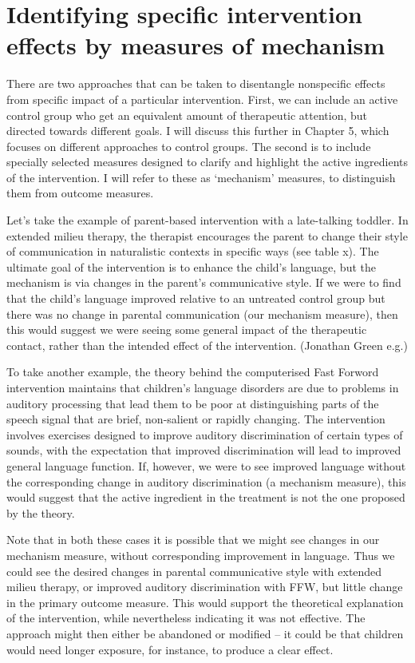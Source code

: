 \documentclass[]{book}
\begin{document}
\hypertarget{identifying-specific-intervention-effects-by-measures-of-mechanism}{%
\section{Identifying specific intervention effects by measures of mechanism}\label{identifying-specific-intervention-effects-by-measures-of-mechanism}}

There are two approaches that can be taken to disentangle nonspecific effects from specific impact of a particular intervention. First, we can include an active control group who get an equivalent amount of therapeutic attention, but directed towards different goals. I will discuss this further in Chapter 5, which focuses on different approaches to control groups. The second is to include specially selected measures designed to clarify and highlight the active ingredients of the intervention. I will refer to these as `mechanism' measures, to distinguish them from outcome measures.

Let's take the example of parent-based intervention with a late-talking toddler. In extended milieu therapy, the therapist encourages the parent to change their style of communication in naturalistic contexts in specific ways (see table x). The ultimate goal of the intervention is to enhance the child's language, but the mechanism is via changes in the parent's communicative style. If we were to find that the child's language improved relative to an untreated control group but there was no change in parental communication (our mechanism measure), then this would suggest we were seeing some general impact of the therapeutic contact, rather than the intended effect of the intervention.
(Jonathan Green e.g.)

To take another example, the theory behind the computerised Fast Forword intervention maintains that children's language disorders are due to problems in auditory processing that lead them to be poor at distinguishing parts of the speech signal that are brief, non-salient or rapidly changing. The intervention involves exercises designed to improve auditory discrimination of certain types of sounds, with the expectation that improved discrimination will lead to improved general language function. If, however, we were to see improved language without the corresponding change in auditory discrimination (a mechanism measure), this would suggest that the active ingredient in the treatment is not the one proposed by the theory.

Note that in both these cases it is possible that we might see changes in our mechanism measure, without corresponding improvement in language. Thus we could see the desired changes in parental communicative style with extended milieu therapy, or improved auditory discrimination with FFW, but little change in the primary outcome measure. This would support the theoretical explanation of the intervention, while nevertheless indicating it was not effective. The approach might then either be abandoned or modified -- it could be that children would need longer exposure, for instance, to produce a clear effect.
\end{document}
